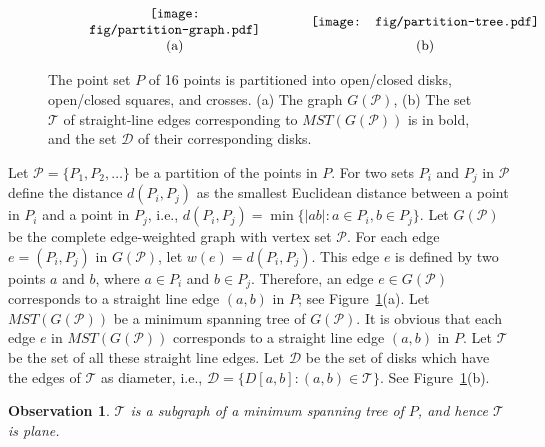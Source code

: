 \documentclass[11pt,a4paper]{article}
\newtheorem{observation}{Observation}
\begin{document}
\begin{figure}[htb]
  \centering
\setlength{\tabcolsep}{0in}
  $\begin{tabular}{cc}
 \multicolumn{1}{m{.5\columnwidth}}{\centering\texttt{[image: fig/partition-graph.pdf]}}
&\multicolumn{1}{m{.5\columnwidth}}{\centering\texttt{[image: fig/partition-tree.pdf]}}\\
(a) & (b)
\end{tabular}$
  \caption{The point set $P$ of 16 points is partitioned into open/closed disks, open/closed squares, and crosses. (a) The graph $G(\mathcal{P})$, (b) The set $\mathcal{T}$ of straight-line edges corresponding to $MST(G(\mathcal{P}))$ is in bold, and the set $\mathcal{D}$ of their corresponding disks.}
\label{partition-fig}
\end{figure}

Let $\mathcal{P}=\{P_1, P_2,\dots\}$ be a partition of the points in $P$. For two sets $P_i$ and $P_j$ in $\mathcal{P}$ define the distance $d(P_i,P_j)$ as the smallest Euclidean distance between a point in $P_i$ and a point in $P_j$, i.e., $d(P_i,P_j)=\min\{|ab|:a\in P_i, b\in P_j\}$.
Let $G(\mathcal{P})$ be the complete edge-weighted graph with vertex set $\mathcal{P}$. For each edge $e=(P_i,P_j)$ in $G(\mathcal{P})$, let $w(e)=d(P_i,P_j)$. This edge $e$ is defined by two points $a$ and $b$, where $a\in P_i$ and $b\in P_j$. Therefore, an edge $e\in G(\mathcal{P})$ corresponds to a straight line edge $(a,b)$ in $P$; see Figure~\ref{partition-fig}(a). Let $MST(G(\mathcal{P}))$ be a minimum spanning tree of $G(\mathcal{P})$. It is obvious that each edge $e$ in $MST(G(\mathcal{P}))$ corresponds to a straight line edge $(a,b)$ in $P$. Let $\mathcal{T}$ be the set of all these straight line edges. Let $\mathcal{D}$ be the set of disks which have the edges of $\mathcal{T}$ as diameter, i.e., $\mathcal{D}=\{D[a,b]: (a,b)\in \mathcal{T}\}$. See Figure~\ref{partition-fig}(b). 



\begin{observation}
 \label{T-plane}
$\mathcal{T}$ is a subgraph of a minimum spanning tree of $P$, and hence $\mathcal{T}$ is plane.
\end{observation}
\end{document}
